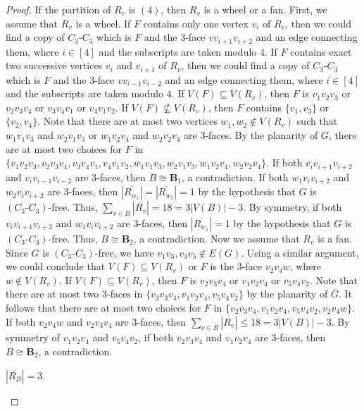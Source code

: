 \documentclass[10pt,a4paper]{amsart}
\begin{document}
\begin{proof}
    If the partition of $R_v$ is $(4)$, then $R_v$ is a wheel or a fan.
    First, we assume that $R_v$ is a wheel.
    If $F$ contains only one vertex $v_i$ of $R_v$, then we could find a copy of $C_3\textbf{-}C_3$ which is $F$ and the $3$-face $vv_{i+1}v_{i+2}$ and an edge connecting them, where $i\in[4]$ and the subscripts are taken modulo $4$.
    If $F$ contains exact two successive vertices $v_{i}$ and $v_{i+1}$ of $R_v$, then we could find a copy of $C_3\textbf{-}C_3$ which is $F$ and the $3$-face $vv_{i-1}v_{i-2}$ and an edge connecting them, where $i\in[4]$ and the subscripts are taken modulo $4$.
    If $V(F)\subseteq V(R_v)$, then $F$ is $v_1v_2v_3$ or $v_2v_3v_4$ or $v_3v_4v_1$ or $v_4v_1v_2$.
    If $V(F)\not \subseteq V(R_v)$, then $F$ contains $\{v_1, v_3\}$ or $\{v_2, v_4\}$.
    Note that there are at most two vertices $w_1,w_2\notin V(R_v)$ such that $w_1v_1v_{3}$ and $w_2v_1v_3$ or $w_1v_2v_4$ and $w_2v_2v_4$ are $3$-faces.
    By the planarity of $G$, there are at most two choices for $F$ in $\{v_1v_2v_3, v_2v_3v_4, v_3v_4v_1, v_4v_1v_2, w_1v_1v_{3}, w_2v_1v_3, w_1v_2v_4, w_2v_2v_4\}$.
    If both $v_{i}v_{i+1}v_{i+2}$ and $v_{i}v_{i-1}v_{i-2}$ are $3$-faces, then $B\cong\mathbf{B}_1$, a contradiction. 
    If both $w_1v_iv_{i+2}$ and $w_2v_iv_{i+2}$ are $3$-faces, then $|\overline{R_{w_1}}|=|\overline{R_{w_2}}|=1$ by the hypothesis that $G$ is $(C_3\textbf{-}C_3)$-free.
    Thus, $\sum_{v \in B}|\overline{R_v}| = 18 = 3|V(B)|-3$.
    By symmetry, if both $v_{i}v_{i+1}v_{i+2}$ and $w_1v_iv_{i+2}$ are $3$-faces, then $|\overline{R_{w_1}}|=1$ by the hypothesis that $G$ is $(C_3\textbf{-}C_3)$-free.
    Thus, $B\cong\mathbf{B}_2$, a contradiction.
    Now we assume that $R_v$ is a fan. Since $G$ is $(C_3\textbf{-}C_3)$-free, we have $v_1v_3,v_3v_5\notin E(G)$.
    Using a similar argument, we could conclude that $V(F)\subseteq V(R_v)$ or $F$ is the $3$-face $v_2v_4w$, where $w\notin V(R_v)$.
    If $V(F)\subseteq V(R_v)$, then $F$ is $v_2v_3v_4$ or $v_1v_2v_4$ or $v_5v_4v_2$. 
    Note that there are at most two $3$-faces in $\{v_2v_3v_4, v_1v_2v_4, v_5v_4v_2\}$ by the planarity of $G$.
    It follows that there are at most two choices for $F$ in $\{v_2v_3v_4, v_1v_2v_4, v_5v_4v_2, v_2v_4w\}$.
    If both $v_2v_4w$ and $v_2v_3v_4$ are $3$-faces, then $\sum_{v \in B}|\overline{R_v}| \leq 18=3|V(B)|-3$.
    By symmetry of $v_1v_2v_4$ and $v_5v_4v_2$, if both $v_2v_3v_4$ and $v_1v_2v_4$ are $3$-faces, then $B\cong\mathbf{B}_2$, a contradiction. 

    \begin{case}
        $|\overline{R_B}| = 3$. 
    \end{case}


\end{proof}
\end{document}
